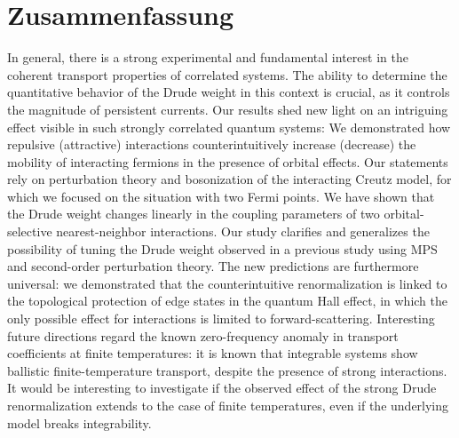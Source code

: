 %
\chapter*{Zusammenfassung}
%
In general, there is a strong experimental and fundamental interest in the coherent transport properties of correlated systems.
The ability to determine the quantitative behavior of the Drude weight in this context is crucial, as it controls the magnitude of persistent currents.
Our results shed new light on an intriguing effect visible in such strongly correlated quantum systems: We demonstrated how repulsive (attractive) interactions counterintuitively increase (decrease) the mobility of interacting fermions in the presence of orbital effects.
Our statements rely on perturbation theory and bosonization of the interacting Creutz model, for which we focused on the situation with two Fermi points.
We have shown that the Drude weight changes linearly in the coupling parameters of two orbital- selective nearest-neighbor interactions.
Our study clarifies and generalizes the possibility of tuning the Drude weight observed in a previous study using MPS and second-order perturbation theory.
The new predictions are furthermore universal: we demonstrated that the counterintuitive renormalization is linked to the topological protection of edge states in the quantum Hall effect, in which the only possible effect for interactions is limited to forward-scattering.
Interesting future directions regard the known zero-frequency anomaly in transport coefficients at finite temperatures: it is known that integrable systems show ballistic finite-temperature transport, despite the presence of strong interactions.
It would be interesting to investigate if the observed effect of the strong Drude renormalization extends to the case of finite temperatures, even if the underlying model breaks integrability.

